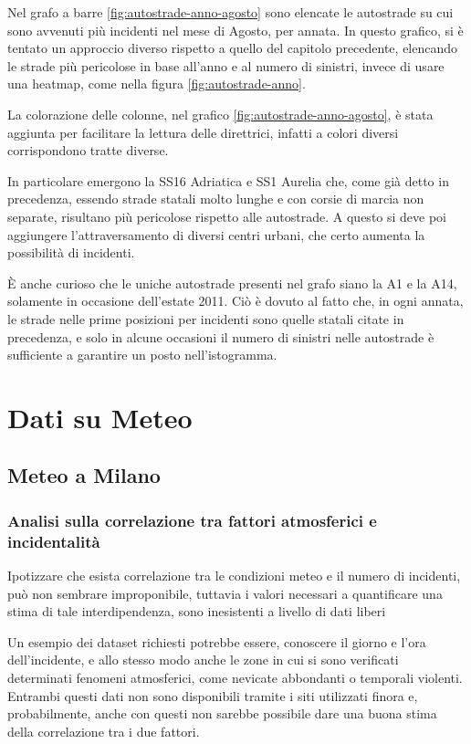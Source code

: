 \documentclass[a4paper,12pt]{report}
\begin{document}
Nel grafo a barre \ref{fig:autostrade-anno-agosto} sono elencate le 
autostrade su cui sono avvenuti più incidenti nel mese di Agosto, per annata. 
In questo grafico, si è tentato un approccio diverso rispetto a quello del capitolo precedente, 
elencando le strade più pericolose in base all'anno e al numero di sinistri, invece di usare una 
heatmap, come nella figura \ref{fig:autostrade-anno}. 

La colorazione delle colonne, nel grafico \ref{fig:autostrade-anno-agosto}, è stata aggiunta per 
facilitare la lettura delle direttrici, infatti a colori diversi corrispondono tratte diverse. 

In particolare emergono la SS16 Adriatica e SS1 Aurelia che, come già 
detto in precedenza, essendo strade statali molto lunghe e con corsie di marcia 
non separate, risultano più pericolose rispetto alle autostrade. 
A questo si deve poi aggiungere l'attraversamento di diversi centri urbani, 
che certo aumenta la possibilità di incidenti. 

\`E anche curioso che le uniche autostrade presenti nel grafo siano la A1 e la A14, 
solamente in occasione dell'estate 2011. 
Ciò è dovuto al fatto che, in ogni annata, le strade nelle prime posizioni per incidenti sono 
quelle statali citate in precedenza, e solo in alcune occasioni il numero di sinistri 
nelle autostrade è sufficiente a garantire un posto nell'istogramma. 

\chapter{Dati su Meteo}

\section{Meteo a Milano}

\subsection{Analisi sulla correlazione tra fattori atmosferici e incidentalità}


Ipotizzare che esista correlazione tra le condizioni meteo e il numero di incidenti, 
può non sembrare improponibile, tuttavia i valori necessari a quantificare una stima
di tale interdipendenza, sono inesistenti a livello di dati liberi

Un esempio dei dataset richiesti potrebbe essere, conoscere il giorno e l'ora 
dell'incidente, e allo stesso modo anche le zone in cui si sono verificati determinati 
fenomeni atmosferici, come nevicate abbondanti o temporali violenti. 
Entrambi questi dati non sono disponibili tramite i siti utilizzati finora e, 
probabilmente, anche con questi non sarebbe possibile dare una buona stima della correlazione 
tra i due fattori. 
\end{document}
